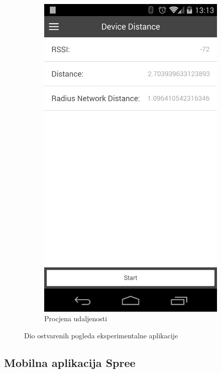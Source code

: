 \begin{figure}[H]
\begin{subfigure}[b]{0.45\textwidth}
        \includegraphics[scale=0.15]{pictures/experimental4}
        \caption{Procjena udaljenosti}
        \label{fig:exp4}
    \end{subfigure}
    
    \caption{Dio ostvarenih pogleda eksperimentalne aplikacije}
\end{figure}

\subsection{Mobilna aplikacija Spree}

